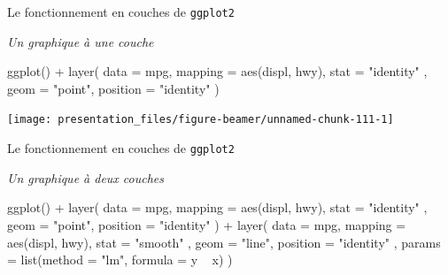 \documentclass[12pt,ignorenonframetext,handout,]{beamer}
\newenvironment{Shaded}{}{}
\newcommand{\DataTypeTok}[1]{#1}
\newcommand{\KeywordTok}[1]{\textcolor[rgb]{0.00,0.00,1.00}{#1}}
\newcommand{\NormalTok}[1]{#1}
\newcommand{\OperatorTok}[1]{#1}
\newcommand{\StringTok}[1]{\textcolor[rgb]{0.00,0.50,0.50}{#1}}
\renewenvironment{Shaded}{\begin{snugshade}}{\end{snugshade}}
\begin{document}
\begin{frame}[fragile]{\large Le fonctionnement en \og couches \fg{} de
\texttt{ggplot2}}
\protect\hypertarget{le-fonctionnement-en-couches-de-ggplot2-1}{}

\emph{Un graphique à une couche}

\footnotesize \centering

\begin{Shaded}
\begin{Highlighting}[]
\KeywordTok{ggplot}\NormalTok{() }\OperatorTok{+}\StringTok{ }\KeywordTok{layer}\NormalTok{(}
  \DataTypeTok{data =}\NormalTok{ mpg, }\DataTypeTok{mapping =} \KeywordTok{aes}\NormalTok{(displ, hwy), }\DataTypeTok{stat =} \StringTok{"identity"}
\NormalTok{  , }\DataTypeTok{geom =} \StringTok{"point"}\NormalTok{, }\DataTypeTok{position =} \StringTok{"identity"}
\NormalTok{)}
\end{Highlighting}
\end{Shaded}

\texttt{[image: presentation\_files/figure-beamer/unnamed-chunk-111-1]}

\end{frame}

\begin{frame}[fragile]{\large Le fonctionnement en \og couches \fg{} de
\texttt{ggplot2}}
\protect\hypertarget{le-fonctionnement-en-couches-de-ggplot2-2}{}

\emph{Un graphique à deux couches}

\footnotesize \centering

\begin{Shaded}
\begin{Highlighting}[]
\KeywordTok{ggplot}\NormalTok{() }\OperatorTok{+}\StringTok{ }\KeywordTok{layer}\NormalTok{(}
  \DataTypeTok{data =}\NormalTok{ mpg, }\DataTypeTok{mapping =} \KeywordTok{aes}\NormalTok{(displ, hwy), }\DataTypeTok{stat =} \StringTok{"identity"}
\NormalTok{  , }\DataTypeTok{geom =} \StringTok{"point"}\NormalTok{, }\DataTypeTok{position =} \StringTok{"identity"}
\NormalTok{) }\OperatorTok{+}\StringTok{ }\KeywordTok{layer}\NormalTok{(}
  \DataTypeTok{data =}\NormalTok{ mpg, }\DataTypeTok{mapping =} \KeywordTok{aes}\NormalTok{(displ, hwy), }\DataTypeTok{stat =} \StringTok{"smooth"}
\NormalTok{  , }\DataTypeTok{geom =} \StringTok{"line"}\NormalTok{, }\DataTypeTok{position =} \StringTok{"identity"}
\NormalTok{  , }\DataTypeTok{params =} \KeywordTok{list}\NormalTok{(}\DataTypeTok{method =} \StringTok{"lm"}\NormalTok{, }\DataTypeTok{formula =}\NormalTok{ y }\OperatorTok{~}\StringTok{ }\NormalTok{x)}
\NormalTok{)}
\end{Highlighting}
\end{Shaded}

\vfill

\vfill

\end{frame}
\end{document}
